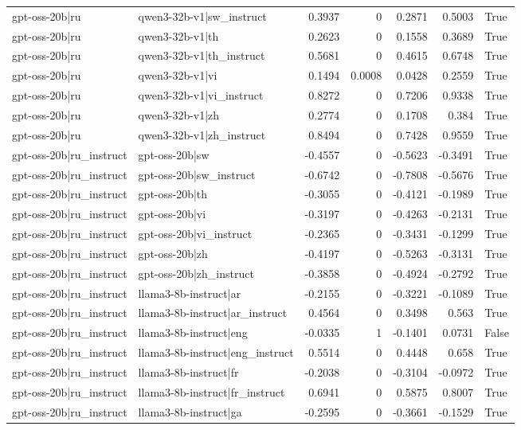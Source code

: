\begin{table}
\begin{tabular}{l l r r r r l}
gpt-oss-20b|ru & qwen3-32b-v1|sw_instruct & 0.3937 & 0 & 0.2871 & 0.5003 & True \\
gpt-oss-20b|ru & qwen3-32b-v1|th & 0.2623 & 0 & 0.1558 & 0.3689 & True \\
gpt-oss-20b|ru & qwen3-32b-v1|th_instruct & 0.5681 & 0 & 0.4615 & 0.6748 & True \\
gpt-oss-20b|ru & qwen3-32b-v1|vi & 0.1494 & 0.0008 & 0.0428 & 0.2559 & True \\
gpt-oss-20b|ru & qwen3-32b-v1|vi_instruct & 0.8272 & 0 & 0.7206 & 0.9338 & True \\
gpt-oss-20b|ru & qwen3-32b-v1|zh & 0.2774 & 0 & 0.1708 & 0.384 & True \\
gpt-oss-20b|ru & qwen3-32b-v1|zh_instruct & 0.8494 & 0 & 0.7428 & 0.9559 & True \\
gpt-oss-20b|ru_instruct & gpt-oss-20b|sw & -0.4557 & 0 & -0.5623 & -0.3491 & True \\
gpt-oss-20b|ru_instruct & gpt-oss-20b|sw_instruct & -0.6742 & 0 & -0.7808 & -0.5676 & True \\
gpt-oss-20b|ru_instruct & gpt-oss-20b|th & -0.3055 & 0 & -0.4121 & -0.1989 & True \\
gpt-oss-20b|ru_instruct & gpt-oss-20b|vi & -0.3197 & 0 & -0.4263 & -0.2131 & True \\
gpt-oss-20b|ru_instruct & gpt-oss-20b|vi_instruct & -0.2365 & 0 & -0.3431 & -0.1299 & True \\
gpt-oss-20b|ru_instruct & gpt-oss-20b|zh & -0.4197 & 0 & -0.5263 & -0.3131 & True \\
gpt-oss-20b|ru_instruct & gpt-oss-20b|zh_instruct & -0.3858 & 0 & -0.4924 & -0.2792 & True \\
gpt-oss-20b|ru_instruct & llama3-8b-instruct|ar & -0.2155 & 0 & -0.3221 & -0.1089 & True \\
gpt-oss-20b|ru_instruct & llama3-8b-instruct|ar_instruct & 0.4564 & 0 & 0.3498 & 0.563 & True \\
gpt-oss-20b|ru_instruct & llama3-8b-instruct|eng & -0.0335 & 1 & -0.1401 & 0.0731 & False \\
gpt-oss-20b|ru_instruct & llama3-8b-instruct|eng_instruct & 0.5514 & 0 & 0.4448 & 0.658 & True \\
gpt-oss-20b|ru_instruct & llama3-8b-instruct|fr & -0.2038 & 0 & -0.3104 & -0.0972 & True \\
gpt-oss-20b|ru_instruct & llama3-8b-instruct|fr_instruct & 0.6941 & 0 & 0.5875 & 0.8007 & True \\
gpt-oss-20b|ru_instruct & llama3-8b-instruct|ga & -0.2595 & 0 & -0.3661 & -0.1529 & True \\

\end{tabular}
\end{table}
